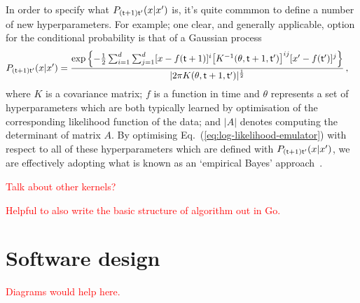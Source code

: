 In order to specify what $P_{({\sf t}+1){\sf t}'}(x\vert x')$ is, it's quite commmon to define a number of new hyperparameters. For example; one clear, and generally applicable, option for the conditional probability is that of a Gaussian process 
\begin{align}
P_{({\sf t}+1){\sf t}'}(x\vert x') &= \frac{{\rm exp}\left\{ -\frac{1}{2}\sum^d_{i=1}\sum^d_{j=1}[x-f({\sf t}+1)]^i \big[ K^{-1}(\theta , {\sf t}+1,{\sf t}')\big]^{ij}[x'-f({\sf t}')]^j  \right\}}{\vert 2\pi K(\theta , {\sf t}+1,{\sf t}') \vert^{\frac{1}{2}}} \label{eq:gaussian-process-cond-prob}\,,
\end{align}
where $K$ is a covariance matrix; $f$ is a function in time and $\theta$ represents a set of hyperparameters which are both typically learned by optimisation of the corresponding likelihood function of the data; and $\vert A\vert$ denotes computing the determinant of matrix $A$. By optimising Eq.~(\ref{eq:log-likelihood-emulator}) with respect to all of these hyperparameters which are defined with $P_{({\sf t}+1){\sf t}'}(x\vert x')$, we are effectively adopting what is known as an `empirical Bayes' approach~\cite{murphy2012machine, mackay2003information}.

\textcolor{red}{Talk about other kernels?}

\textcolor{red}{Helpful to also write the basic structure of algorithm out in Go.}

\section{\sffamily Software design}

\textcolor{red}{Diagrams would help here.}